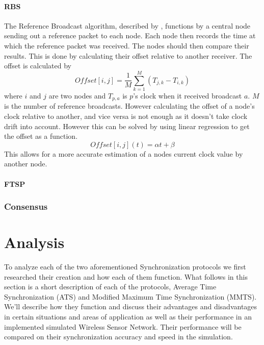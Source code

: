 \documentclass[a4paper,12pt]{article}
\begin{document}
    \paragraph{RBS} The Reference Broadcast algorithm, described by \cite{ElsonGirodEstrin02},  functions by a central node sending out a reference packet to each node. Each node then records the time at which the reference packet was received. %
    The nodes should then compare their results. This is done by calculating their offset relative to another receiver. The offset is calculated by 
    \begin{equation}
        \label{offsetcalc}
        \textit{Offset} [i,j] = \frac{1}{M}\sum^M_{k=1} (T_{j,k} - T_{i,k})
    \end{equation}
    where $i$ and $j$ are two nodes and $T_{p,a}$ is $p$'s clock when it received broadcast $a$. $M$ is the number of reference broadcasts.  %
    However calculating the offset of a node's clock relative to another, and vice versa is not enough as it doesn't take clock drift into account. However this can be solved by using linear regression to get the offset as a function.
    $$\textit{Offset}[i,j](t) = \alpha t + \beta$$
    This allows for a more accurate estimation of a nodes current clock value by another node.
    
    
   
    
    \paragraph{FTSP}
    
    \subsubsection{Consensus}
    
    


\section{Analysis}%
To analyze each of the two aforementioned Synchronization protocols we first researched their creation and how each of them function. What follows in this section is a short description of each of the protocols, Average Time Synchronization (ATS) and Modified Maximum Time Synchronization (MMTS). We'll describe how they function and discuss their advantages and disadvantages in certain situations and areas of application as well as their performance in an implemented simulated Wireless Sensor Network. Their performance will be compared on their synchronization accuracy and speed in the simulation.
\end{document}
